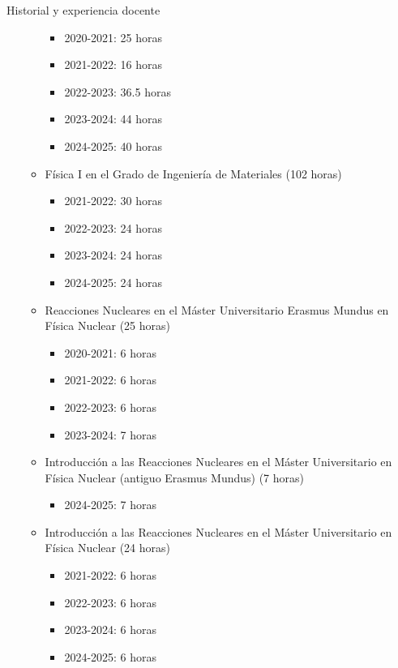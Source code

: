 \documentclass{resume2} %
\begin{document}
\begin{rSection}{Historial y experiencia docente}
\begin{enumerate}[label=\alph*.]
\begin{itemize}
\begin{itemize}
\item 2020-2021: 25 horas
\item 2021-2022: 16 horas
\item 2022-2023: 36.5 horas
\item 2023-2024: 44 horas
\item 2024-2025: 40 horas
\end{itemize}

\item F\'isica I en el Grado de Ingenier\'ia de Materiales (102 horas)

\begin{itemize}
\item 2021-2022: 30 horas
\item 2022-2023: 24 horas
\item 2023-2024: 24 horas
\item 2024-2025: 24 horas
\end{itemize}


\item Reacciones Nucleares en el M\'aster Universitario Erasmus Mundus en F\'isica Nuclear (25 horas)

\begin{itemize}
\item 2020-2021: 6 horas
\item 2021-2022: 6 horas
\item 2022-2023: 6 horas
\item 2023-2024: 7 horas
\end{itemize}

\item Introducci\'on a las Reacciones Nucleares en el M\'aster Universitario en F\'isica Nuclear (antiguo Erasmus Mundus) (7 horas)

\begin{itemize}
\item 2024-2025: 7 horas
\end{itemize}

\item Introducci\'on a las Reacciones Nucleares en el M\'aster Universitario en F\'isica Nuclear (24 horas)

\begin{itemize}
\item 2021-2022: 6 horas
\item 2022-2023: 6 horas
\item 2023-2024: 6 horas
\item 2024-2025: 6 horas
\end{itemize}


\end{itemize}
\end{enumerate}
\end{rSection}
\end{document}
